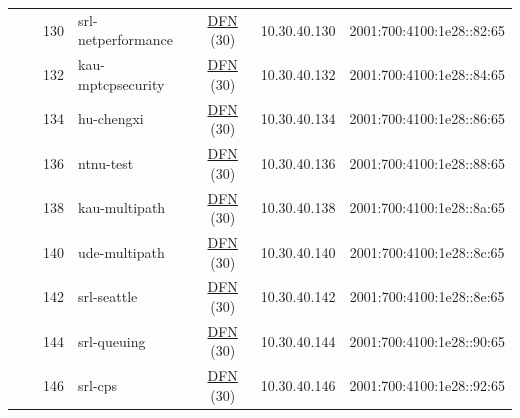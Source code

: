 \begin{small}
\begin{center}
\begin{longtable}{|c|c|c|c|c|c|c|c|}
  &  & \tiny{130} & \multicolumn{1}{|l|}{\tiny{srl-netperformance}} & \multicolumn{2}{|c|}{\tiny{\href{https://www.dfn.de}{DFN} (30)}} & \tiny{10.30.40.130} & \tiny{2001:700:4100:1e28::82:65} \\* \cline{3-3}\cline{4-4}\cline{5-5}\cline{6-6}\cline{7-7}\cline{8-8}
  &  & \tiny{132} & \multicolumn{1}{|l|}{\tiny{kau-mptcpsecurity}} & \multicolumn{2}{|c|}{\tiny{\href{https://www.dfn.de}{DFN} (30)}} & \tiny{10.30.40.132} & \tiny{2001:700:4100:1e28::84:65} \\* \cline{3-3}\cline{4-4}\cline{5-5}\cline{6-6}\cline{7-7}\cline{8-8}
  &  & \tiny{134} & \multicolumn{1}{|l|}{\tiny{hu-chengxi}} & \multicolumn{2}{|c|}{\tiny{\href{https://www.dfn.de}{DFN} (30)}} & \tiny{10.30.40.134} & \tiny{2001:700:4100:1e28::86:65} \\* \cline{3-3}\cline{4-4}\cline{5-5}\cline{6-6}\cline{7-7}\cline{8-8}
  &  & \tiny{136} & \multicolumn{1}{|l|}{\tiny{ntnu-test}} & \multicolumn{2}{|c|}{\tiny{\href{https://www.dfn.de}{DFN} (30)}} & \tiny{10.30.40.136} & \tiny{2001:700:4100:1e28::88:65} \\* \cline{3-3}\cline{4-4}\cline{5-5}\cline{6-6}\cline{7-7}\cline{8-8}
  &  & \tiny{138} & \multicolumn{1}{|l|}{\tiny{kau-multipath}} & \multicolumn{2}{|c|}{\tiny{\href{https://www.dfn.de}{DFN} (30)}} & \tiny{10.30.40.138} & \tiny{2001:700:4100:1e28::8a:65} \\* \cline{3-3}\cline{4-4}\cline{5-5}\cline{6-6}\cline{7-7}\cline{8-8}
  &  & \tiny{140} & \multicolumn{1}{|l|}{\tiny{ude-multipath}} & \multicolumn{2}{|c|}{\tiny{\href{https://www.dfn.de}{DFN} (30)}} & \tiny{10.30.40.140} & \tiny{2001:700:4100:1e28::8c:65} \\* \cline{3-3}\cline{4-4}\cline{5-5}\cline{6-6}\cline{7-7}\cline{8-8}
  &  & \tiny{142} & \multicolumn{1}{|l|}{\tiny{srl-seattle}} & \multicolumn{2}{|c|}{\tiny{\href{https://www.dfn.de}{DFN} (30)}} & \tiny{10.30.40.142} & \tiny{2001:700:4100:1e28::8e:65} \\* \cline{3-3}\cline{4-4}\cline{5-5}\cline{6-6}\cline{7-7}\cline{8-8}
  &  & \tiny{144} & \multicolumn{1}{|l|}{\tiny{srl-queuing}} & \multicolumn{2}{|c|}{\tiny{\href{https://www.dfn.de}{DFN} (30)}} & \tiny{10.30.40.144} & \tiny{2001:700:4100:1e28::90:65} \\* \cline{3-3}\cline{4-4}\cline{5-5}\cline{6-6}\cline{7-7}\cline{8-8}
  &  & \tiny{146} & \multicolumn{1}{|l|}{\tiny{srl-cps}} & \multicolumn{2}{|c|}{\tiny{\href{https://www.dfn.de}{DFN} (30)}} & \tiny{10.30.40.146} & \tiny{2001:700:4100:1e28::92:65} \\* \cline{3-3}\cline{4-4}\cline{5-5}\cline{6-6}\cline{7-7}\cline{8-8}

\end{longtable}
\end{center}
\end{small}
